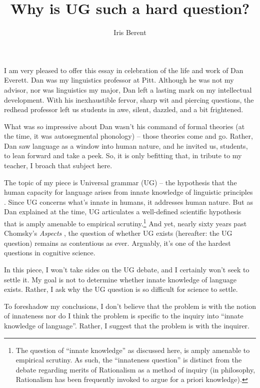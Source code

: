 \documentclass[output=paper,colorlinks,citecolor=brown
]{langscibook}
\author{Iris Berent\orcid{0000-0003-2820-9693}\affiliation{Northeastern University}}
\title{Why is UG such a hard question?}
\begin{document}
\maketitle

\noindent I am very pleased to offer this essay in celebration of the life and work of Dan Everett. Dan was my linguistics professor at Pitt. Although he was not my advisor, nor was linguistics my major, Dan left a lasting mark on my intellectual development. With his inexhaustible fervor, sharp wit and piercing questions, the redhead professor left us students in awe, silent, dazzled, and a bit frightened. 

What was so impressive about Dan wasn’t his command of formal theories (at the time, it was autosegmental phonology) -- those theories come and go. Rather, Dan saw language as a window into human nature, and he invited us, students, to lean forward and take a peek. So, it is only befitting that, in tribute to my teacher, I broach that subject here.

The topic of my piece is Universal grammar (UG) --  the hypothesis that the human capacity for language arises from innate knowledge of linguistic principles \citep{chomsky1965aspects}. Since UG concerns what’s innate in humans, it addresses human nature.  But as Dan explained at the time, UG articulates a well-defined scientific hypothesis that is amply amenable to empirical scrutiny.\footnote{The question of “innate knowledge” as discussed here, is amply amenable to empirical scrutiny. As such, the “innateness question” is distinct from the debate regarding merits of Rationalism as a method of inquiry (in philosophy, Rationalism has been frequently invoked to argue for a priori knowledge).} And yet, nearly sixty years past Chomsky’s \textit{Aspects} \citep{chomsky1965aspects}, the question of whether UG exists (hereafter: the UG question) remains as contentious as ever.  Arguably, it’s one of the hardest questions in cognitive science.

In this piece, I won’t take sides on the UG debate, and I certainly won’t seek to settle it.  My goal is not to determine whether innate knowledge of language exists. Rather, I ask why the UG question is so difficult for science to settle.  

To foreshadow my conclusions, I don’t believe that the problem is with the notion of innateness nor do I think the problem is specific to the inquiry into “innate knowledge of language”. Rather, I suggest that the problem is with the inquirer.  
\end{document}
